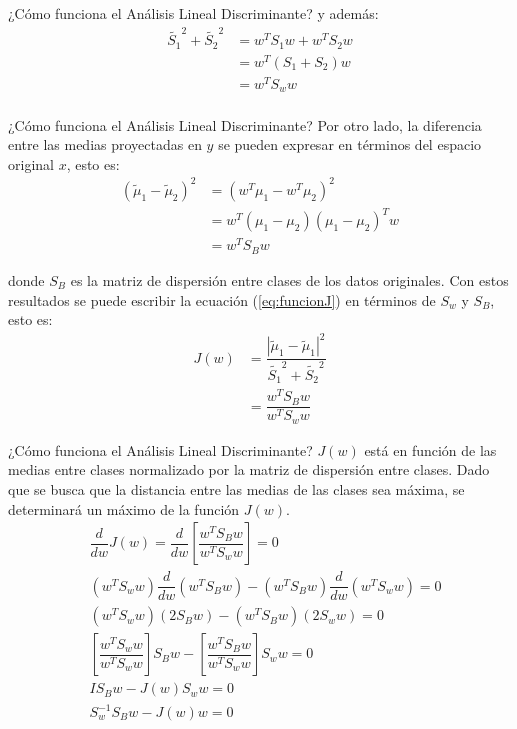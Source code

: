 \documentclass[11pt,aspectratio=169]{beamer}
\begin{document}
\begin{frame}{¿Cómo funciona el Análisis Lineal Discriminante?}
y además: \pause
\begin{align*}
	\widetilde{S_1}^2 + \widetilde{S_2}^2 &= w^TS_1w + w^TS_2w\\
		&= w^T(S_1+S_2)w\\
		&= w^TS_ww\\
\end{align*}
\end{frame}

\begin{frame}{¿Cómo funciona el Análisis Lineal Discriminante?}
Por otro lado, la diferencia entre las medias proyectadas en $y$ se pueden expresar en términos del espacio original $x$, esto es:\pause
\begin{align*}
	(\widetilde{\mu}_1 - \widetilde{\mu}_2)^2 &= (w^T\mu_1 - w^T\mu_2)^2\\
		&= w^T(\mu_1-\mu_2)(\mu_1-\mu_2)^Tw\\
		&= w^TS_Bw
\end{align*}

donde $S_B$ es la matriz de dispersión entre clases de los datos originales.\pause
Con estos resultados se puede escribir la ecuación (\ref{eq:funcionJ}) en términos de $S_w$ y $S_B$, esto es:\pause
\begin{align*}
	J(w) &= \dfrac{|\widetilde{\mu}_1 - \widetilde{\mu}_1|^2}{\widetilde{S_1}^2 + \widetilde{S_2}^2} \\
		&= \dfrac{w^TS_Bw}{w^TS_ww}
\end{align*}
\end{frame}

\begin{frame}{¿Cómo funciona el Análisis Lineal Discriminante?}
$J(w)$ está en función de las medias entre clases normalizado por la matriz de dispersión entre clases. Dado que se busca que 
la distancia entre las medias de las clases sea máxima, se determinará un máximo de la función $J(w)$.
\begin{align*}
	&\dfrac{d}{dw}J(w) = \dfrac{d}{dw	}\left[\dfrac{w^TS_Bw}{w^TS_ww}\right] = 0\\
	&	(w^TS_ww)\dfrac{d}{dw}(w^TS_Bw)-(w^TS_Bw)\dfrac{d}{dw}(w^TS_ww)=0\\
	&	(w^TS_ww)(2S_Bw)-(w^TS_Bw)(2S_ww) = 0\\
	&	\left[\dfrac{w^TS_ww}{w^TS_ww}\right]S_Bw - \left[\dfrac{w^TS_Bw}{w^TS_ww}\right]S_ww  = 0\\
	&	IS_Bw-J(w)S_ww = 0\\
	&	S_w^{-1}S_Bw - J(w)w = 0
\end{align*}
\end{frame}
\end{document}
